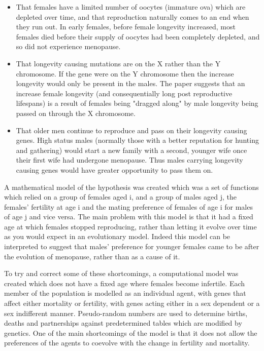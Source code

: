 \documentclass[authoryearcitations]{UoYCSproject}
\begin{document}
\begin{itemize}
\item That females have a limited number of oocytes (immature ova) which are depleted over time, and that reproduction naturally comes to an end when they run out. \cite{humanPopBio1994} In early females, before female longevity increased, most females died before their supply of oocytes had been completely depleted, and so did not experience menopause.
\item That longevity causing mutations are on the X rather than the Y chromosome. If the gene were on the Y chromosome then the increase longevity would only be present in the males. The paper suggests that an increase female longevity (and consequentially long post reproductive lifespans) is a result of females being "dragged along" by male longevity being passed on through the X chromosome. 
\item That older men continue to reproduce and pass on their longevity causing genes. High status males (normally those with a better reputation for hunting and gathering) would start a new family with a second, younger wife once their first wife had undergone menopause. Thus males carrying longevity causing genes would have greater opportunity to pass them on.
\end{itemize}

A mathematical model of the hypothesis was created \cite{whyMenMatter2007} which was a set of functions which relied on a group of females aged i, and a group of males aged j, the females' fertility at age i and the mating preference of females of age i for males of age j and vice versa. The main problem with this model is that it had a fixed age at which females stopped reproducing, rather than letting it evolve over time as you would expect in an evolutionary model. Indeed this model can be interpreted to suggest that males' preference for younger females came to be after the evolution of menopause, rather than as a cause of it.

To try and correct some of these shortcomings, a computational model \cite{mateChoice2013} was created which does not have a fixed age where females become infertile. Each member of the population is modelled as an individual agent, with genes that affect either mortality or fertility, with genes acting either in a sex dependent or a sex indifferent manner. Pseudo-random numbers are used to determine births, deaths and partnerships against predetermined tables which are modified by genetics. One of the main shortcomings of the model is that it does not allow the preferences of the agents to coevolve with the change in fertility and mortality. 
\end{document}
